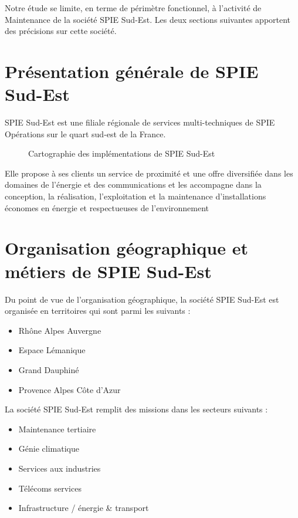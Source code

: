Notre étude se limite, en terme de périmètre fonctionnel, à l'activité de Maintenance de la société SPIE Sud-Est. Les deux sections suivantes apportent des précisions sur cette société.

\section{Présentation générale de SPIE Sud-Est}

SPIE Sud-Est est une filiale régionale de services multi-techniques de SPIE Opérations sur le quart sud-est de la France.

\begin{figure}[H]
    \label{fig-implem-spie}
    \noindent{}
    \caption{Cartographie des implémentations de SPIE Sud-Est}
\end{figure}

Elle propose à ses clients un service de proximité et une offre diversifiée dans les domaines de l'énergie et des communications et les accompagne dans la conception, la réalisation, l’exploitation et la maintenance d’installations économes en énergie et respectueuses de l’environnement

\section{Organisation géographique et métiers de SPIE Sud-Est}

Du point de vue de l'organisation géographique, la société SPIE Sud-Est est organisée en territoires qui sont parmi les suivants : \\
\begin{itemize}
    \item[\textbullet] Rhône Alpes Auvergne
    \item[\textbullet] Espace Lémanique
    \item[\textbullet] Grand Dauphiné
    \item[\textbullet] Provence Alpes Côte d'Azur\\
\end{itemize}
    
La société SPIE Sud-Est remplit des missions dans les secteurs suivants :  \\
\begin{itemize}
    \item[\textbullet] Maintenance tertiaire
    \item[\textbullet] Génie climatique
    \item[\textbullet] Services aux industries
    \item[\textbullet] Télécoms services
    \item[\textbullet] Infrastructure / énergie \& transport
\end{itemize}